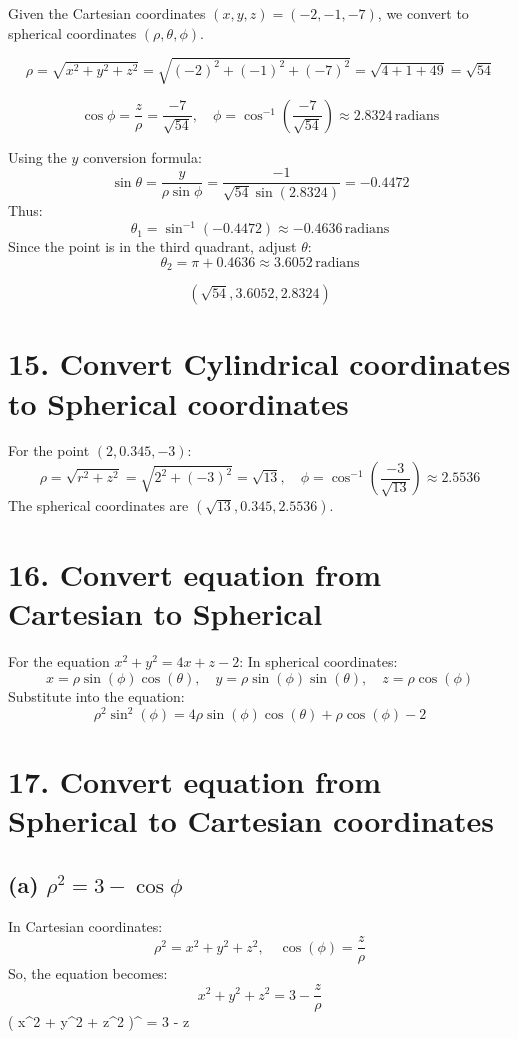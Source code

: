 \documentclass[11pt]{article}
\begin{document}
Given the Cartesian coordinates \((x, y, z) = (-2, -1, -7)\), we convert to spherical coordinates \((\rho, \theta, \phi)\).


\[
\rho = \sqrt{x^2 + y^2 + z^2} = \sqrt{(-2)^2 + (-1)^2 + (-7)^2} = \sqrt{4 + 1 + 49} = \sqrt{54}
\]


\[
\cos\phi = \frac{z}{\rho} = \frac{-7}{\sqrt{54}}, \quad \phi = \cos^{-1}\left(\frac{-7}{\sqrt{54}}\right) \approx 2.8324 \, \text{radians}
\]



Using the \(y\) conversion formula:
\[
\sin\theta = \frac{y}{\rho \sin\phi} = \frac{-1}{\sqrt{54} \sin(2.8324)} = -0.4472
\]
Thus:
\[
\theta_1 = \sin^{-1}(-0.4472) \approx -0.4636 \, \text{radians}
\]
Since the point is in the third quadrant, adjust \(\theta\):
\[
\theta_2 = \pi + 0.4636 \approx 3.6052 \, \text{radians}
\]


\[
\left( \sqrt{54}, 3.6052, 2.8324 \right)
\]


\section*{15. Convert Cylindrical coordinates to Spherical coordinates}
For the point \((2, 0.345, -3)\):
\[
\rho = \sqrt{r^2 + z^2} = \sqrt{2^2 + (-3)^2} = \sqrt{13}, \quad \phi = \cos^{-1}\left(\frac{-3}{\sqrt{13}}\right) \approx 2.5536
\]
The spherical coordinates are \((\sqrt{13}, 0.345, 2.5536)\).

\section*{16. Convert equation from Cartesian to Spherical}
For the equation \(x^2 + y^2 = 4x + z - 2\):
In spherical coordinates:
\[
x = \rho \sin(\phi) \cos(\theta), \quad y = \rho \sin(\phi) \sin(\theta), \quad z = \rho \cos(\phi)
\]
Substitute into the equation:
\[
\rho^2 \sin^2(\phi) = 4\rho \sin(\phi) \cos(\theta) + \rho \cos(\phi) - 2
\]

\section*{17. Convert equation from Spherical to Cartesian coordinates}
\subsection*{(a) \( \rho^2 = 3 - \cos \phi \)}
In Cartesian coordinates:
\[
\rho^2 = x^2 + y^2 + z^2, \quad \cos(\phi) = \frac{z}{\rho}
\]
So, the equation becomes:
\[
x^2 + y^2 + z^2 = 3 - \frac{z}{\rho}
\]
{{{{\left( {{x^2} + {y^2} + {z^2}} \right)}^{}} = 3  - z}}
\end{document}
